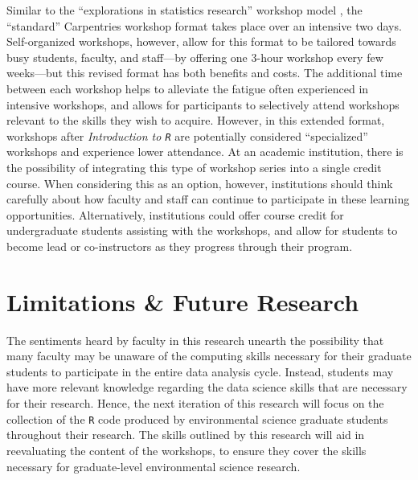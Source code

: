 \documentclass[12pt]{article}
\begin{document}
\quad Similar to the ``explorations in statistics research'' workshop model
\citep{esr}, the ``standard'' Carpentries workshop format takes place over an
intensive two days. Self-organized workshops, however, allow for this format to
be tailored towards busy students, faculty, and staff---by offering one 3-hour
workshop every few weeks---but this revised format has both benefits and costs.
The additional time between each workshop helps to alleviate the fatigue often
experienced in intensive workshops, and allows for participants to selectively
attend workshops relevant to the skills they wish to acquire. However, in this
extended format, workshops after \emph{Introduction to \texttt{R}} are
potentially considered ``specialized'' workshops and experience lower
attendance. At an academic institution, there is the possibility of integrating
this type of workshop series into a single credit course. When considering this
as an option, however, institutions should think carefully about how faculty and
staff can continue to participate in these learning opportunities.
Alternatively, institutions could offer course credit for undergraduate students
assisting with the workshops, and allow for students to become lead or 
co-instructors as they progress through their program.

\section{Limitations \& Future Research} 
\label{sec:future}

\noindent The sentiments heard by faculty in this research unearth the
possibility that many faculty may be unaware of the computing skills necessary
for their graduate students to participate in the entire data analysis cycle.
Instead, students may have more relevant knowledge regarding the data science
skills that are necessary for their research. Hence, the next iteration of this
research will focus on the collection of the \texttt{R} code produced
by environmental science graduate students throughout their research. The skills
outlined by this research will aid in reevaluating the content of the workshops, to
ensure they cover the skills necessary for graduate-level environmental science
research. 

\end{document}
